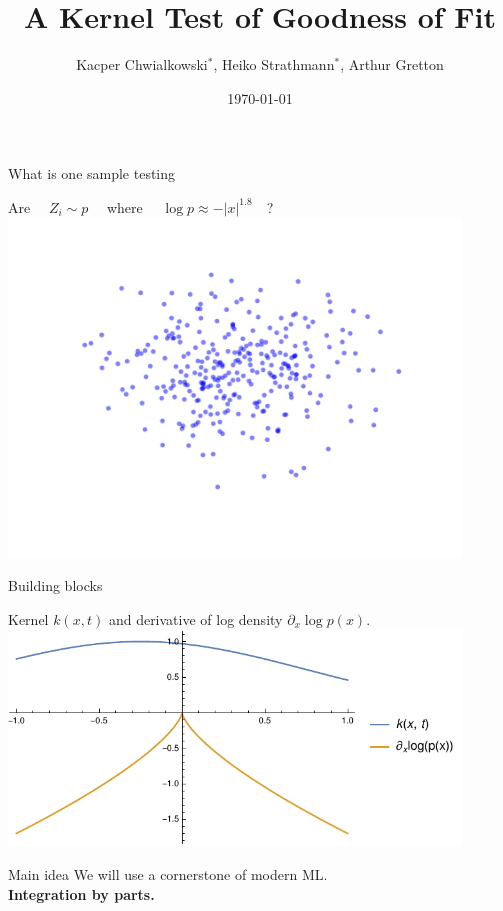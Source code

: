 \documentclass{beamer}
\title{ A Kernel Test of Goodness of Fit}
\date{\today}
\author{Kacper Chwialkowski$^*$, Heiko Strathmann$^*$, Arthur Gretton}
\institute{}
\begin{document}
\frame{\titlepage}
 \begin{frame}{What is one sample testing }
 \begin{center}
Are $\quad Z_i \sim p \quad$ where $\quad \log p \approx -|x|^{1.8} \quad$?\\
 \includegraphics[width=0.9\textwidth]{./img/mixtureOfNormal.pdf} 
 \end{center}
 
 \end{frame} 
  \begin{frame}{Building blocks}
\begin{center}
Kernel $k(x,t)$ and derivative of log density  $\partial_{x} \log p(x)$.
 \includegraphics[width=0.9\textwidth]{./img/kp.pdf} 
 \end{center}
 \end{frame} 
 
 
 \begin{frame}{Main idea}
We will use a cornerstone of modern ML.\\


\pause
\bf{Integration by parts.}
 \end{frame} 
\end{document}
